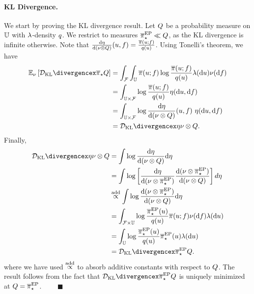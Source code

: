 \documentclass[12pt]{article}
\begin{document}
\paragraph{KL Divergence.} We start by proving the KL divergence result.
Let $Q$ be a probability measure on $\mathbb{U}$ with 
$\lambda$-density $q$. We restrict to measures 
${\overline{\pi}}_{\star}^{\mathrm{EP}} \ll Q$, as the KL divergence is infinite otherwise. 
Note that 
$\frac{\d\emJoint}{\d(\emDist \otimes \qMeas)}(\Par, \targetTraj) = \frac{\postDensNorm(\Par; \targetTraj)}{\qDens(\Par)}$.
Using Tonelli's theorem, we have 
\begin{align*}
\E_{\emDist}\left[\KL{\postNormEm}{\qMeas} \right]
&= \int_{\emSpace} \int_{\parSpace} 
\postDensNorm(\Par; \targetTraj) \log \frac{\postDensNorm(\Par; \targetTraj)}{\qDens(\Par)}
\refMeas(\d\Par) \emDist(\d\targetTraj) \\
&= \int_{\parSpace \times \emSpace}  \log \frac{\postDensNorm(\Par; \targetTraj)}{\qDens(\Par)}
\emJoint(\d\Par, \d\targetTraj) \\
&= \int_{\parSpace \times \emSpace}  \log \frac{\d\emJoint}{\d(\emDist \otimes \qMeas)}(\Par, \targetTraj)
\ \emJoint(\d\Par, \d\targetTraj) \\
&= \KL{\emJoint}{\emDist \otimes \qMeas}.
\end{align*}
Finally, 
\begin{align*}
\KL{\emJoint}{\emDist \otimes \qMeas}
&= \int \log \frac{\d\emJoint}{\d(\emDist \otimes \qMeas)} \d\emJoint \\
&= \int \log \left[\frac{\d\emJoint}{\d(\emDist \otimes \postApproxEP)} \frac{\d(\emDist \otimes \postApproxEP)}{\d(\emDist \otimes \qMeas)}\right] d\emJoint \\
&\proptoAdd \int \log \frac{\d(\emDist \otimes \postApproxEP)}{\d(\emDist \otimes \qMeas)} \d\emJoint \\
&= \int_{\emSpace \times \parSpace} 
\log \frac{\postApproxEP(\Par)}{\qDens(\Par)} \postDensNorm(\Par; \targetTraj) \emDist(\d\targetTraj) \refMeas(\d\Par) \\
&= \int_{\parSpace} \log \frac{\postApproxEP(\Par)}{\qDens(\Par)} 
 \postApproxEP(\Par) \refMeas(\d\Par) \\
&= \KL{\postApproxEP}{\qMeas}.
\end{align*} 
where we have used $\overset{\mathrm{add}}{\propto}$ to absorb additive constants with respect to $Q$. The result follows 
from the fact that $\KL{\postApproxEP}{\qMeas}$ is uniquely minimized at $Q = {\overline{\pi}}_{\star}^{\mathrm{EP}}$. $\qquad \blacksquare$
\end{document}
